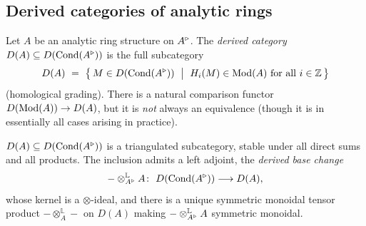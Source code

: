 \subsection{Derived categories of analytic rings}

\begin{definition}
\label{def:8:derived-cat}
Let $A$ be an analytic ring structure on $A^{\triangleright}$. The \emph{derived category}
$D(A)\subseteq D(\operatorname{Cond}(A^{\triangleright}))$ is the full subcategory
\begin{equation*}
D(A)\ =\ \bigl\{\, M\in D(\operatorname{Cond}(A^{\triangleright}))\ \bigm|\ H_{i}(M)\in\operatorname{Mod}(A)\ \text{for all }i\in\mathbb{Z}\,\bigr\}
\end{equation*}
(homological grading). There is a natural comparison functor
$D(\operatorname{Mod}(A))\to D(A)$, but it is \emph{not} always an equivalence (though it is in
essentially all cases arising in practice).
\end{definition}

\begin{proposition}[Structure of $D(A)$]
\label{prop:8:D-triangulated}
$D(A)\subseteq D(\operatorname{Cond}(A^{\triangleright}))$ is a triangulated subcategory, stable under all
direct sums and all products. The inclusion admits a left adjoint, the
\emph{derived base change}
\begin{equation*}
-\otimes^{\mathbb{L}}_{\ur A}A\colon\ D(\Cond(\ur A))\longrightarrow D(A),
\end{equation*}
whose kernel is a $\otimes$-ideal, and there is a unique symmetric monoidal
tensor product $-\otimes^{\mathbb{L}}_{A}-$ on $D(A)$ making
$-\otimes^{\mathbb{L}}_{A^{\triangleright}}A$ symmetric monoidal.
\end{proposition}

